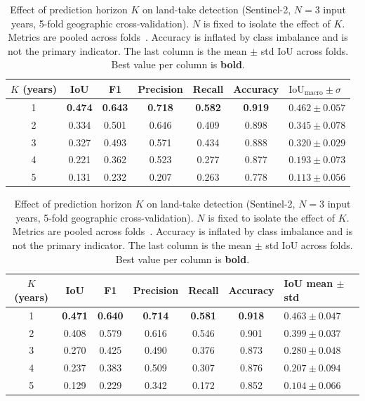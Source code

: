 

\begin{table}[ht]
  \centering
  \caption{%
    Effect of prediction horizon $K$ on land-take detection
    (Sentinel-2, $N = 3$ input years, 5-fold geographic cross-validation).
    $N$ is fixed to isolate the effect of $K$.
    Metrics are pooled across folds~\citep{garnot2021pastis}.
    Accuracy is inflated by class imbalance and is not the primary indicator.
    The last column is the mean $\pm$ std IoU across folds.
    Best value per column is \textbf{bold}.%
  }
  
   \label{tab:k_slicing_old_(all_input_years)}
  \begin{tabular}{ccccccl}
    \toprule
    $K$ (years) & IoU & F1 & Precision & Recall & Accuracy & $\text{IoU}_{\text{macro}} \pm \sigma$ \\
    \midrule
    1 & \textbf{0.474} & \textbf{0.643} & \textbf{0.718} & \textbf{0.582} & \textbf{0.919} & $0.462 \pm 0.057$ \\
    2 & 0.334           & 0.501           & 0.646           & 0.409           & 0.898           & $0.345 \pm 0.078$ \\
    3 & 0.327           & 0.493           & 0.571           & 0.434           & 0.888           & $0.320 \pm 0.029$ \\
    4 & 0.221           & 0.362           & 0.523           & 0.277           & 0.877           & $0.193 \pm 0.073$ \\
    5 & 0.131           & 0.232           & 0.207           & 0.263           & 0.778           & $0.113 \pm 0.056$ \\
    \bottomrule
  \end{tabular}

  \label{tab:k_slicing}
  \begin{tabular}{ccccccl}
    \toprule
    $K$ (years) & IoU & F1 & Precision & Recall & Accuracy & IoU mean $\pm$ std \\
    \midrule
    1 & \textbf{0.471} & \textbf{0.640} & \textbf{0.714} & \textbf{0.581} & \textbf{0.918} & $0.463 \pm 0.047$ \\
    2 & 0.408           & 0.579           & 0.616           & 0.546           & 0.901           & $0.399 \pm 0.037$ \\
    3 & 0.270           & 0.425           & 0.490           & 0.376           & 0.873           & $0.280 \pm 0.048$ \\
    4 & 0.237           & 0.383           & 0.509           & 0.307           & 0.876           & $0.207 \pm 0.094$ \\
    5 & 0.129           & 0.229           & 0.342           & 0.172           & 0.852           & $0.104 \pm 0.066$ \\
    \bottomrule
  \end{tabular}
\end{table}
